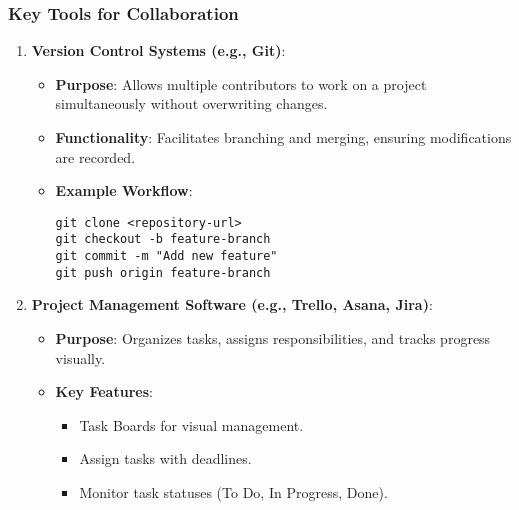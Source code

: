 \documentclass[aspectratio=169]{beamer}
\begin{document}
\begin{frame}[fragile]
    \frametitle{Key Tools for Collaboration}
    \begin{enumerate}
        \item \textbf{Version Control Systems (e.g., Git)}:
        \begin{itemize}
            \item \textbf{Purpose}: Allows multiple contributors to work on a project simultaneously without overwriting changes.
            \item \textbf{Functionality}: Facilitates branching and merging, ensuring modifications are recorded.
            \item \textbf{Example Workflow}:
            \begin{lstlisting}
git clone <repository-url>
git checkout -b feature-branch
git commit -m "Add new feature"
git push origin feature-branch
            \end{lstlisting}
        \end{itemize}
        
        \item \textbf{Project Management Software (e.g., Trello, Asana, Jira)}:
        \begin{itemize}
            \item \textbf{Purpose}: Organizes tasks, assigns responsibilities, and tracks progress visually.
            \item \textbf{Key Features}:
            \begin{itemize}
                \item Task Boards for visual management.
                \item Assign tasks with deadlines.
                \item Monitor task statuses (To Do, In Progress, Done).
            \end{itemize}
        \end{itemize}
    \end{enumerate}
\end{frame}
\end{document}
